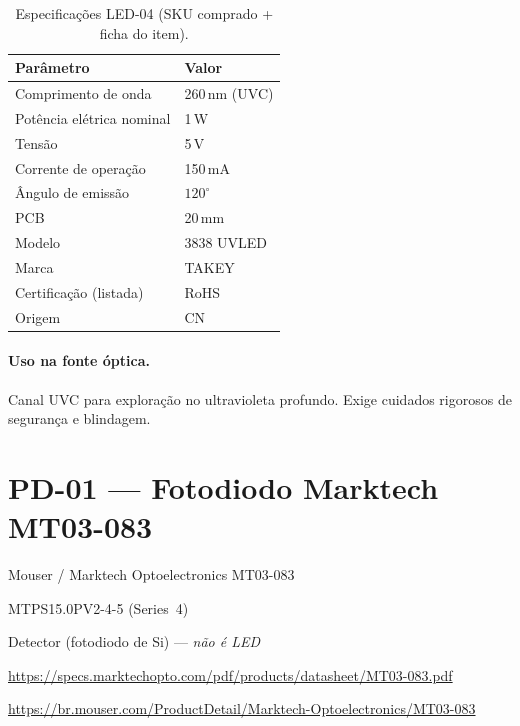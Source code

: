 \documentclass[11pt,a4paper]{article}
\begin{document}
\begin{table}[ht]
\centering
\caption{Especificações LED-04 (SKU comprado + ficha do item).}
\begin{tabular}{@{}ll@{}}
\toprule
Parâmetro & Valor \\
\midrule
Comprimento de onda & 260\,nm (UVC) \\
Potência elétrica nominal & 1\,W \\
Tensão & 5\,V \\
Corrente de operação & 150\,mA \\
Ângulo de emissão & $120^\circ$ \\
PCB & 20\,mm \\
Modelo & 3838 UVLED \\
Marca & TAKEY \\
Certificação (listada) & RoHS \\
Origem & CN \\
\bottomrule
\end{tabular}
\end{table}

\paragraph{Uso na fonte óptica.}
Canal UVC para exploração no ultravioleta profundo. Exige cuidados
rigorosos de segurança e blindagem.

\section{PD-01 --- Fotodiodo Marktech MT03-083}

\begin{description}[style=nextline,leftmargin=2.2cm,font=\normalfont\bfseries]
  \item[Identificação] Mouser / Marktech Optoelectronics MT03-083
  \item[Descrição interna] MTPS15.0PV2-4-5 (Series~4)
  \item[Função] Detector (fotodiodo de Si) --- \emph{não é LED}
  \item[Datasheet] \url{https://specs.marktechopto.com/pdf/products/datasheet/MT03-083.pdf}
  \item[Link compra] \url{https://br.mouser.com/ProductDetail/Marktech-Optoelectronics/MT03-083}
\end{description}
\end{document}
